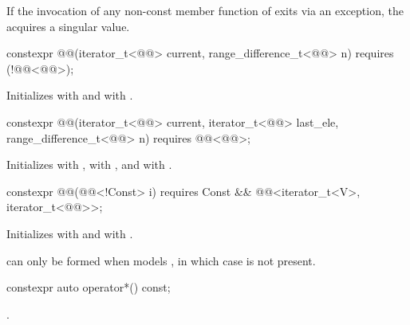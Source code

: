 \pnum
If the invocation of any non-const member function of 
exits via an exception, the  acquires a singular value.

\begin{itemdecl}
constexpr @@(iterator_t<@@> current, range_difference_t<@@> n)
  requires (!@@<@@>);
\end{itemdecl}

\begin{itemdescr}
\pnum
\effects
Initializes  with  and
 with .
\end{itemdescr}

\begin{itemdecl}
constexpr @@(iterator_t<@@> current, iterator_t<@@> last_ele,
                   range_difference_t<@@> n)
  requires @@<@@>;
\end{itemdecl}

\begin{itemdescr}
\pnum
\effects
Initializes  with ,
 with , and
 with .
\end{itemdescr}

\begin{itemdecl}
constexpr @@(@@<!Const> i)
  requires Const && @@<iterator_t<V>, iterator_t<@@>>;
\end{itemdecl}

\begin{itemdescr}
\pnum
\effects
Initializes  with  and
 with .
\begin{note}
 can only be formed
when  models ,
in which case  is not present.
\end{note}
\end{itemdescr}

\begin{itemdecl}
constexpr auto operator*() const;
\end{itemdecl}

\begin{itemdescr}
\pnum
\returns
{}.
\end{itemdescr}

